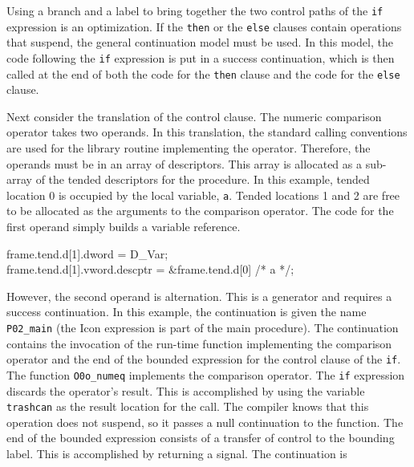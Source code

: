 \noindent
Using a branch and a label to bring together the two control paths of
the \texttt{if} expression is an optimization. If the \texttt{then} or
the \texttt{else} clauses contain operations that suspend, the general
continuation model must be used. In this model, the code following the
\texttt{if} expression is put in a success continuation, which is then
called at the end of both the code for the \texttt{then} clause and
the code for the \texttt{else} clause.

Next consider the translation of the control clause. The numeric
comparison operator takes two operands. In this translation, the
standard calling conventions are used for the library routine
implementing the operator. Therefore, the operands must be in an array
of descriptors. This array is allocated as a sub-array of the tended
descriptors for the procedure. In this example, tended location 0 is
occupied by the local variable, \texttt{a}. Tended locations 1 and 2 are free
to be allocated as the arguments to the comparison operator. The code
for the first operand simply builds a variable reference.

\goodbreak
\begin{iconcode}
\>frame.tend.d[1].dword = D\_Var;\\
\>frame.tend.d[1].vword.descptr = \&frame.tend.d[0] /* a */;\\
\end{iconcode}

\noindent
However, the second operand is alternation. This is a generator and
requires a success continuation. In this example, the continuation is
given the name \texttt{P02\_main} (the Icon expression is part of the main
procedure). The continuation contains the invocation of the run-time
function implementing the comparison operator and the end of the
bounded expression for the control clause of the \texttt{if}. The function
\texttt{O0o\_numeq} implements the comparison operator. The \texttt{if} expression
discards the operator's result. This is accomplished by using the
variable \texttt{trashcan} as the result location for the call. The compiler
knows that this operation does not suspend, so it passes a null
continuation to the function. The end of the bounded expression
consists of a transfer of control to the bounding label. This is
accomplished by returning a signal. The continuation is

